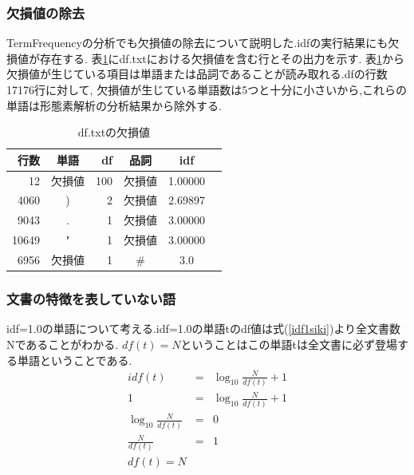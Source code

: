 \documentclass[a4j]{jarticle}
\begin{document}
\subsubsection{欠損値の除去}
TermFrequencyの分析でも欠損値の除去について説明した.idfの実行結果にも欠損値が存在する.
表\ref{dfmv}にdf.txtにおける欠損値を含む行とその出力を示す.
表\ref{dfmv}から欠損値が生じている項目は単語または品詞であることが読み取れる.dfの行数17176行に対して,
欠損値が生じている単語数は5つと十分に小さいから,これらの単語は形態素解析の分析結果から除外する.
\begin{table}[H]
	\caption{df.txtの欠損値}
	\label{dfmv}
	\begin{center}
		\begin{tabular}{r|c r c c r}\hline
			行数 & 単語 & df & 品詞 & idf \\ \hline
			\hline
			12 & 欠損値 & 100 & 欠損値 & 1.00000 \\
			4060  &  )  & 2  & 欠損値 & 2.69897 \\
			9043   & .  & 1 & 欠損値 & 3.00000 \\
			10649 & " & 1 & 欠損値 & 3.00000 \\
			6956 & 欠損値 & 1 & \# & 3.0 \\ \hline
 		\end{tabular}
	\end{center}
	\end{table}

\subsubsection{文書の特徴を表していない語}
idf=1.0の単語について考える.idf=1.0の単語tのdf値は式(\ref{idf1siki})より全文書数Nであることがわかる.
$df(t) = N$ということはこの単語tは全文書に必ず登場する単語ということである.
\begin{eqnarray}
	idf(t) &=& \log_{10} \frac{N}{df(t)} +1 \\
	1  &=& \log_{10} \frac{N}{df(t)} +1 \\
	\log_{10} \frac{N}{df(t)} &=& 0 \\
	\frac{N}{df(t)} &=& 1 \\
	df(t) = N
	\label{idf1siki}
\end{eqnarray}
\end{document}
